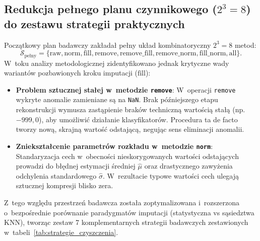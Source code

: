 \subsection{Redukcja pełnego planu czynnikowego ($2^3 = 8$) do zestawu strategii praktycznych}
Początkowy plan badawczy zakładał pełny układ kombinatoryczny $2^3 = 8$ metod:
\begin{equation}
\mathcal{S}_{\text{pełny}} = \{\text{raw}, \text{norm}, \text{fill}, \text{remove}, \text{remove\_fill}, \text{remove\_norm}, \text{fill\_norm}, \text{all}\}.
\end{equation}
W~toku analizy metodologicznej zidentyfikowano jednak krytyczne wady wariantów pozbawionych kroku imputacji ($\text{fill}$):
\begin{itemize}
    \item \textbf{Problem sztucznej stałej w~metodzie \texttt{remove}}: W~operacji \texttt{remove} wykryte anomalie zamieniane są na \texttt{NaN}. Brak późniejszego etapu rekonstrukcji wymusza zastąpienie braków techniczną wartością stałą (np.~$-999{,}0$), aby umożliwić działanie klasyfikatorów. Procedura ta de facto tworzy nową, skrajną wartość odstającą, negując sens eliminacji anomalii.
    \item \textbf{Zniekształcenie parametrów rozkładu w~metodzie \texttt{norm}}: Standaryzacja cech w~obecności nieskorygowanych wartości odstających prowadzi do błędnej estymacji średniej $\hat{\mu}$ oraz drastycznego zawyżenia odchylenia standardowego $\hat{\sigma}$. W~rezultacie typowe wartości cech ulegają sztucznej kompresji blisko zera.
\end{itemize}

Z~tego względu przestrzeń badawcza została zoptymalizowana i~rozszerzona o~bezpośrednie porównanie paradygmatów imputacji (statystyczna vs sąsiedztwa KNN), tworząc zestaw 7 komplementarnych strategii badawczych zestawionych w~tabeli~\ref{tab:strategie_czyszczenia}.

